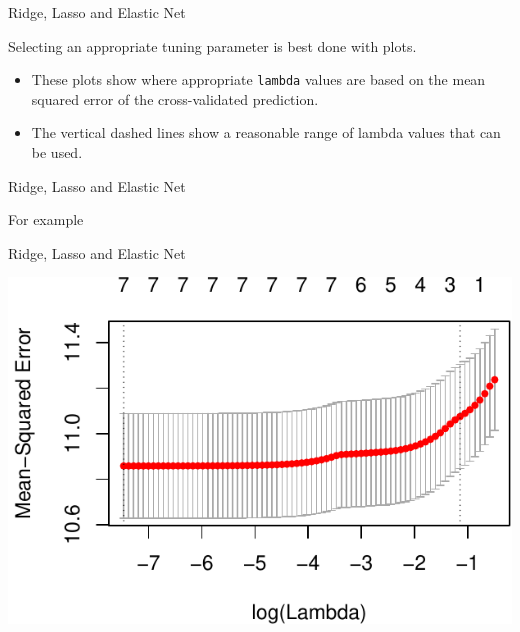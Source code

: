 \begin{frame}[fragile]{Ridge, Lasso and Elastic Net}

Selecting an appropriate tuning parameter is best done with plots.

\begin{itemize}
\tightlist
\item
  These plots show where appropriate \texttt{lambda} values are based on
  the mean squared error of the cross-validated prediction.
\item
  The vertical dashed lines show a reasonable range of lambda values
  that can be used.
\end{itemize}

\end{frame}

\begin{frame}[fragile]{Ridge, Lasso and Elastic Net}

\begin{block}{For example}

\begin{Shaded}
\begin{Highlighting}[]
\end{Highlighting}
\end{Shaded}

\end{block}

\end{frame}

\begin{frame}{Ridge, Lasso and Elastic Net}

\includegraphics{07_OtherModels_files/figure-beamer/unnamed-chunk-15-1.pdf}

\end{frame}

